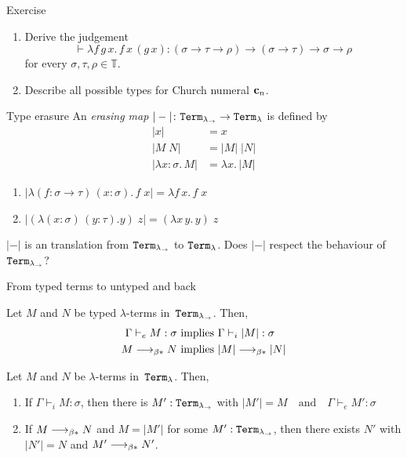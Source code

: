 \begin{frame}{Exercise}
  \begin{enumerate}
    \item Derive the judgement
      \[
        \vdash \lambda f\,g\,x.\, f\,x\, (g\,x) : (\sigma \to \tau \to \rho) \to
        (\sigma\to\tau) \to \sigma\to\rho 
      \]
      for every $\sigma, \tau, \rho \in \mathbb{T}$.

    \item Describe all possible types for Church numeral $\mathbf{c}_{n}$.

    
  \end{enumerate}

\end{frame}


\begin{frame}{Type erasure}
  An \emph{erasing map} $|-|\colon \mathtt{Term}_{\lambda_\to} \to \mathtt{Term}_{\lambda}$ is defined by
  \begin{align*}
    |x| & = x \\
    |M\; N| & = |M|\;|N| \\
    |\lambda x:\sigma.\, M| & = \lambda x.\, |M|
  \end{align*}
  \begin{example}
    \begin{enumerate}
      \item $|\lambda (f: \sigma \to \tau)\,(x: \sigma).\, f\;x| = \lambda f\, x.\, f\;x$
      \item $|(\lambda (x: \sigma)\,(y: \tau). y)\;z| = (\lambda x\,y.\, y)\; z$
    \end{enumerate}
  \end{example}

  $|-|$ is an translation from $\mathtt{Term}_{\lambda_\to}$ to $\mathtt{Term}_{\lambda}$.
  Does $|-|$ respect the behaviour of $\mathtt{Term}_{\lambda_\to}$?
\end{frame}
\begin{frame}{From typed terms to untyped and back}
\begin{proposition}
  Let $M$ and $N$ be typed $\lambda$-terms in~$\mathtt{Term}_{\lambda_\to}$. Then, 
  \begin{align*}
    \Gamma  \vdash_e M : \sigma & \text{ implies } \Gamma \vdash_i |M| :
    \sigma \\ 
    M \longrightarrow_{\beta*} N & \text{ implies } |M| \longrightarrow_{\beta*} |N|
  \end{align*}
\end{proposition}

\begin{proposition}
  Let $M$ and $N$ be $\lambda$-terms in~$\mathtt{Term}_{\lambda}$. Then, 
  \begin{enumerate}
  \item If $\Gamma \vdash_i M : \sigma$, then there is $M' : \mathtt{Term}_{\lambda_\to}$ with 
        $|M'| = M
        \quad\text{and}\quad
        \Gamma \vdash_e M' : \sigma$
      \item If $M \longrightarrow_{\beta*} N$ and $M = |M'|$ for some $M' : \mathtt{Term}_{\lambda_\to}$,
      then there exists $N'$ with $|N'| = N$ and $M' \longrightarrow_{\beta*} N'$.
    \end{enumerate}
\end{proposition}
\end{frame}

